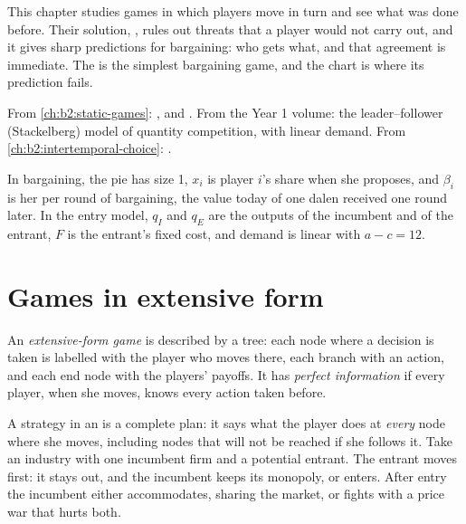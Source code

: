 This chapter studies games in which players move in turn and see what was done before. Their solution,
, rules out threats that a player would not carry out, and it gives sharp
predictions for bargaining: who gets what, and that agreement is immediate. The  is the
simplest bargaining game, and the chart is where its prediction fails.

\begin{recall}
From \cref{ch:b2:static-games}: ,  and . From the Year 1
volume: the leader--follower (Stackelberg) model of quantity competition, with linear demand. From
\cref{ch:b2:intertemporal-choice}: .
\end{recall}

\begin{notation}\label{not:b2:dynamic-games:symbols}
In bargaining, the pie has size 1, $x_i$ is player $i$'s share when she proposes, and $\beta_i$ is her  per round of bargaining, the value today of one dalen received one round later. In the entry model,
$q_I$ and $q_E$ are the outputs of the incumbent and of the entrant, $F$ is the entrant's fixed cost, and demand
is linear with $a - c = 12$.
\end{notation}

\section{Games in extensive form}\label{sec:b2:dynamic-games:extensive}

\begin{definition}\label{def:b2:dynamic-games:extensive-form}
An \emph{extensive-form game} is described by a tree: each node where a decision
is taken is labelled with the player who moves there, each branch with an action, and each end node with
the players' payoffs. It has \emph{perfect information} if every player, when she moves, knows every
action taken before.
\end{definition}

A strategy in an  is a complete plan: it says what the player does at \emph{every}
node where she moves, including nodes that will not be reached if she follows it. Take an industry with
one incumbent firm and a potential entrant. The entrant moves first: it stays out, and the incumbent keeps
its monopoly, or enters. After entry the incumbent either accommodates, sharing the market, or fights with
a price war that hurts both.

